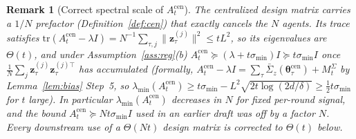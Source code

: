 \documentclass[11pt]{article}
\newtheorem*{remark}{Remark}
\begin{document}
\begin{remark}[Correct spectral scale of $A_t^{\mathrm{cen}}$]\label{rem:spectral}
The centralized design matrix carries a $1/N$ prefactor
(Definition~\ref{def:cen}) that exactly cancels the $N$ agents. Its
trace satisfies
$\mathrm{tr}(A_t^{\mathrm{cen}}-\lambda I)
=N^{-1}\sum_{\tau,j}\|\bm{z}_\tau^{(j)}\|^2\leq tL^2$, so its eigenvalues
are $\Theta(t)$, and under Assumption~\ref{ass:reg}(b)
$A_t^{\mathrm{cen}}\succeq(\lambda+t\sigma_{\min})I\succeq t\sigma_{\min}I$
once $\frac1N\sum_j\bm{z}_\tau^{(j)}\bm{z}_\tau^{(j)\top}$ has accumulated
(formally, $A_t^{\mathrm{cen}}-\lambda I=\sum_{\tau}\bar{\Sigma}_z(\bm{\theta}_\tau^{\mathrm{cen}})+M_t^\Sigma$
by Lemma~\ref{lem:bias} Step~5, so $\lambda_{\min}(A_t^{\mathrm{cen}})\geq
t\sigma_{\min}-L^2\sqrt{2t\log(2d/\delta)}\geq\tfrac12 t\sigma_{\min}$ for
$t$ large).  In particular $\lambda_{\min}(A_t^{\mathrm{cen}})$
\emph{decreases} in $N$ for fixed per-round signal, and the bound
$A_t^{\mathrm{cen}}\succeq Nt\sigma_{\min}I$ used in an earlier draft was
off by a factor $N$.  Every downstream use of a $\Theta(Nt)$ design
matrix is corrected to $\Theta(t)$ below.
\end{remark}
\end{document}
